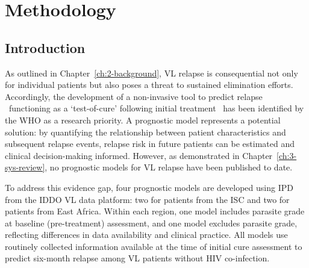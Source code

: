 
\chapter{\label{ch:4-isc-model-methodology}Methodology}
\minitoc

\section{Introduction}

As outlined in Chapter~\ref{ch:2-background}, VL relapse is consequential not only for individual patients but also poses a threat to sustained elimination efforts. Accordingly, the development of a non-invasive tool to predict relapse \textemdash\ functioning as a `test-of-cure' following initial treatment \textemdash\ has been identified by the WHO as a research priority\cite{WHO2024_Leishmaniasis,WHO_2024_VL_easternAfrica,who_sea_elim}. A prognostic model represents a potential solution: by quantifying the relationship between patient characteristics and subsequent relapse events, relapse risk in future patients can be estimated and clinical decision-making informed. However, as demonstrated in Chapter~\ref{ch:3-sys-review}, no prognostic models for VL relapse have been published to date.

To address this evidence gap, four prognostic models are developed using IPD from the IDDO VL data platform: two for patients from the ISC and two for patients from East Africa. Within each region, one model includes parasite grade at baseline (pre-treatment) assessment, and one model excludes parasite grade, reflecting differences in data availability and clinical practice. All models use routinely collected information available at the time of initial cure assessment to predict six-month relapse among VL patients without HIV co-infection.

